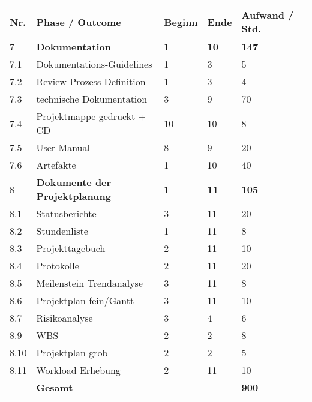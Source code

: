 \begin{tabular}{ | l | p{8cm} | p{2cm}|p{2cm}|p{2cm}|}
\hline
\textbf{Nr.} & \textbf{Phase / Outcome} & \textbf{Beginn}& \textbf{Ende}& \textbf{Aufwand / Std.} \\
\hline
7 &\textbf{Dokumentation}                   &\textbf{1} &\textbf{10} &\textbf{147}  \\
\hline
7.1 &Dokumentations-Guidelines         &1 &3 & 5 \\
\hline
7.2 &Review-Prozess Definition         &1 &3 & 4 \\
\hline
7.3 &technische Dokumentation          &3 &9 & 70 \\
\hline
7.4 &Projektmappe gedruckt + CD        &10 &10 & 8 \\
\hline
7.5 &User Manual                       &8 &9 & 20 \\
\hline
7.6 &Artefakte                         &1 &10 & 40 \\
8 &\textbf{Dokumente der Projektplanung}     &\textbf{1} &\textbf{11} &\textbf{105}  \\
\hline
8.1 & Statusberichte                &3 &11 & 20 \\
\hline
8.2 &Stundenliste                      &1 &11 & 8 \\
\hline
8.3 &Projekttagebuch                   &2 &11 & 10 \\
\hline
8.4 &Protokolle                        &2 &11 & 20 \\
\hline
8.5 &Meilenstein Trendanalyse          &3 &11 & 8 \\
\hline
8.6 &Projektplan fein/Gantt            &3 &11 & 10 \\
\hline
8.7 &Risikoanalyse                     &3 &4 & 6 \\
\hline
8.9 &WBS                               &2 &2 & 8 \\
\hline
8.10 &Projektplan grob                 &2 &2 & 5 \\
\hline
8.11 &Workload Erhebung                &2 &11 & 10 \\
\hline
& \textbf{Gesamt} & & & \textbf{900} \\
\hline
\hline
\end{tabular}
